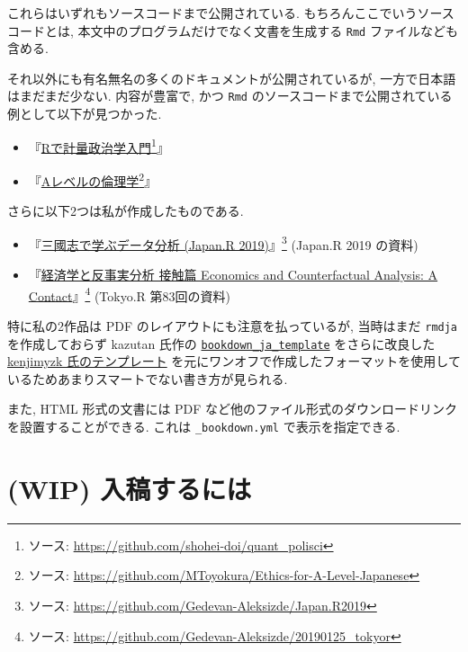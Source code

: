 \documentclass[
  xelatex,ja=standard,jafont=noto]{bxjsbook}
\providecommand{\tightlist}{%
  \setlength{\itemsep}{0pt}\setlength{\parskip}{0pt}}
\theoremstyle{definition}
\theoremstyle{definition}
\theoremstyle{definition}
\theoremstyle{definition}
\theoremstyle{remark}
\begin{document}
これらはいずれもソースコードまで公開されている.
もちろんここでいうソースコードとは,
本文中のプログラムだけでなく文書を生成する \texttt{Rmd}
ファイルなども含める.

それ以外にも有名無名の多くのドキュメントが公開されているが,
一方で日本語はまだまだ少ない. 内容が豊富で, かつ \texttt{Rmd}
のソースコードまで公開されている例として以下が見つかった.

\begin{itemize}
\tightlist
\item
  『\href{https://shohei-doi.github.io/quant_polisci/}{Rで計量政治学入門}\footnote{ソース:
    \url{https://github.com/shohei-doi/quant_polisci}}』
\item
  『\href{https://mtoyokura.github.io/Ethics-for-A-Level-Japanese/}{Aレベルの倫理学}\footnote{ソース:
    \url{https://github.com/MToyokura/Ethics-for-A-Level-Japanese}}』
\end{itemize}

さらに以下2つは私が作成したものである.

\begin{itemize}
\tightlist
\item
  『\href{https://gedevan-aleksizde.github.io/Japan.R2019/}{三國志で学ぶデータ分析
  (Japan.R 2019)}』\footnote{ソース:
    \url{https://github.com/Gedevan-Aleksizde/Japan.R2019}} (Japan.R
  2019 の資料)
\item
  『\href{https://gedevan-aleksizde.github.io/20190125_tokyor/}{経済学と反事実分析
  接触篇 Economics and Counterfactual Analysis: A Contact}』\footnote{ソース:
    \url{https://github.com/Gedevan-Aleksizde/20190125_tokyor}} (Tokyo.R
  第83回の資料)
\end{itemize}

特に私の2作品は PDF のレイアウトにも注意を払っているが, 当時はまだ
\texttt{rmdja} を作成しておらず kazutan 氏作の
\href{https://github.com/kazutan/bookdown_ja_template}{\texttt{bookdown\_ja\_template}}
をさらに改良した
\href{https://github.com/kenjimyzk/bookdown_ja_template}{kenjimyzk
氏のテンプレート}
を元にワンオフで作成したフォーマットを使用しているためあまりスマートでない書き方が見られる.

また, HTML 形式の文書には PDF
など他のファイル形式のダウンロードリンクを設置することができる. これは
\texttt{\_bookdown.yml} で表示を指定できる.

\hypertarget{wip-ux5165ux7a3fux3059ux308bux306bux306f}{%
\section{(WIP)
入稿するには}\label{wip-ux5165ux7a3fux3059ux308bux306bux306f}}
\end{document}
